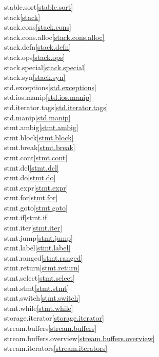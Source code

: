 \begin{multicols}{2}
stable.sort\quad\ref{stable.sort}\\
stack\quad\ref{stack}\\
stack.cons\quad\ref{stack.cons}\\
stack.cons.alloc\quad\ref{stack.cons.alloc}\\
stack.defn\quad\ref{stack.defn}\\
stack.ops\quad\ref{stack.ops}\\
stack.special\quad\ref{stack.special}\\
stack.syn\quad\ref{stack.syn}\\
std.exceptions\quad\ref{std.exceptions}\\
std.ios.manip\quad\ref{std.ios.manip}\\
std.iterator.tags\quad\ref{std.iterator.tags}\\
std.manip\quad\ref{std.manip}\\
stmt.ambig\quad\ref{stmt.ambig}\\
stmt.block\quad\ref{stmt.block}\\
stmt.break\quad\ref{stmt.break}\\
stmt.cont\quad\ref{stmt.cont}\\
stmt.dcl\quad\ref{stmt.dcl}\\
stmt.do\quad\ref{stmt.do}\\
stmt.expr\quad\ref{stmt.expr}\\
stmt.for\quad\ref{stmt.for}\\
stmt.goto\quad\ref{stmt.goto}\\
stmt.if\quad\ref{stmt.if}\\
stmt.iter\quad\ref{stmt.iter}\\
stmt.jump\quad\ref{stmt.jump}\\
stmt.label\quad\ref{stmt.label}\\
stmt.ranged\quad\ref{stmt.ranged}\\
stmt.return\quad\ref{stmt.return}\\
stmt.select\quad\ref{stmt.select}\\
stmt.stmt\quad\ref{stmt.stmt}\\
stmt.switch\quad\ref{stmt.switch}\\
stmt.while\quad\ref{stmt.while}\\
storage.iterator\quad\ref{storage.iterator}\\
stream.buffers\quad\ref{stream.buffers}\\
stream.buffers.overview\quad\ref{stream.buffers.overview}\\
stream.iterators\quad\ref{stream.iterators}\\

\end{multicols}
